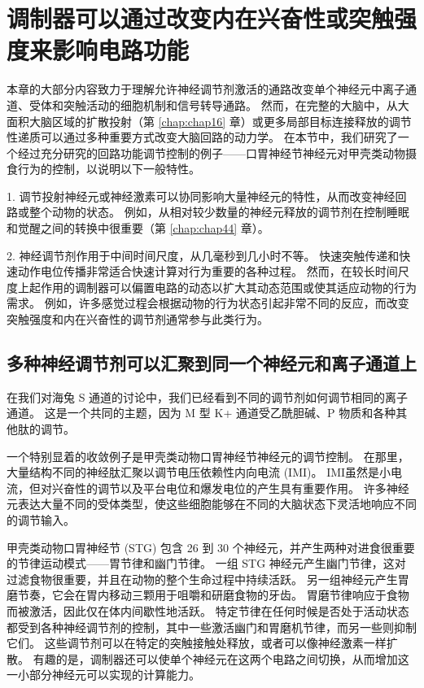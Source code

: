 \section{调制器可以通过改变内在兴奋性或突触强度来影响电路功能}

本章的大部分内容致力于理解允许神经调节剂激活的通路改变单个神经元中离子通道、受体和突触活动的细胞机制和信号转导通路。 
然而，在完整的大脑中，从大面积大脑区域的扩散投射（第 \ref{chap:chap16} 章）或更多局部目标连接释放的调节性递质可以通过多种重要方式改变大脑回路的动力学。 
在本节中，我们研究了一个经过充分研究的回路功能调节控制的例子——口胃神经节神经元对甲壳类动物摄食行为的控制，以说明以下一般特性。


1. 调节投射神经元或神经激素可以协同影响大量神经元的特性，从而改变神经回路或整个动物的状态。 
例如，从相对较少数量的神经元释放的调节剂在控制睡眠和觉醒之间的转换中很重要（第 \ref{chap:chap44} 章）。 


2. 神经调节剂作用于中间时间尺度，从几毫秒到几小时不等。 
快速突触传递和快速动作电位传播非常适合快速计算对行为重要的各种过程。 
然而，在较长时间尺度上起作用的调制器可以偏置电路的动态以扩大其动态范围或使其适应动物的行为需求。 
例如，许多感觉过程会根据动物的行为状态引起非常不同的反应，而改变突触强度和内在兴奋性的调节剂通常参与此类行为。


\subsection{多种神经调节剂可以汇聚到同一个神经元和离子通道上}
在我们对海兔 S 通道的讨论中，我们已经看到不同的调节剂如何调节相同的离子通道。 这是一个共同的主题，因为 M 型 K+ 通道受乙酰胆碱、P 物质和各种其他肽的调节。

一个特别显着的收敛例子是甲壳类动物口胃神经节神经元的调节控制。 
在那里，大量结构不同的神经肽汇聚以调节电压依赖性内向电流 (IMI)。 
IMI虽然是小电流，但对兴奋性的调节以及平台电位和爆发电位的产生具有重要作用。 
许多神经元表达大量不同的受体类型，使这些细胞能够在不同的大脑状态下灵活地响应不同的调节输入。


甲壳类动物口胃神经节 (STG) 包含 26 到 30 个神经元，并产生两种对进食很重要的节律运动模式——胃节律和幽门节律。 
一组 STG 神经元产生幽门节律，这对过滤食物很重要，并且在动物的整个生命过程中持续活跃。 
另一组神经元产生胃磨节奏，它会在胃内移动三颗用于咀嚼和研磨食物的牙齿。 
胃磨节律响应于食物而被激活，因此仅在体内间歇性地活跃。 
特定节律在任何时候是否处于活动状态都受到各种神经调节剂的控制，其中一些激活幽门和胃磨机节律，而另一些则抑制它们。 
这些调节剂可以在特定的突触接触处释放，或者可以像神经激素一样扩散。 
有趣的是，调制器还可以使单个神经元在这两个电路之间切换，从而增加这一小部分神经元可以实现的计算能力。


